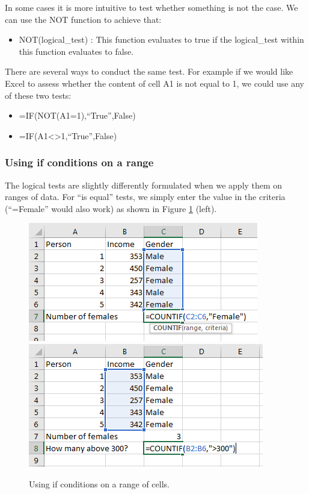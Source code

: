 \documentclass[]{book}
\providecommand{\tightlist}{%
  \setlength{\itemsep}{0pt}\setlength{\parskip}{0pt}}
\begin{document}
In some cases it is more intuitive to test whether something is not the case. We can use the NOT function to achieve that:

\begin{itemize}
\tightlist
\item
  NOT(logical\_test) : This function evaluates to true if the logical\_test within this function evaluates to false.
\end{itemize}

There are several ways to conduct the same test. For example if we would like Excel to assess whether the content of cell A1 is not equal to 1, we could use any of these two tests:

\begin{itemize}
\tightlist
\item
  =IF(NOT(A1=1),``True'',False)
\item
  =IF(A1\textless\textgreater1,``True'',False)
\end{itemize}

\hypertarget{using-if-conditions-on-a-range}{%
\subsubsection*{Using if conditions on a range}\label{using-if-conditions-on-a-range}}

The logical tests are slightly differently formulated when we apply them on ranges of data. For ``is equal'' tests, we simply enter the value in the criteria (``=Female'' would also work) as shown in Figure \ref{fig:advex1} (left).

\begin{figure}

{\centering \includegraphics[width=0.5\linewidth]{_resources/chapter_advexc/7} \includegraphics[width=0.5\linewidth]{_resources/chapter_advexc/8} 

}

\caption{Using if conditions on a range of cells.}\label{fig:advex1}
\end{figure}
\end{document}

